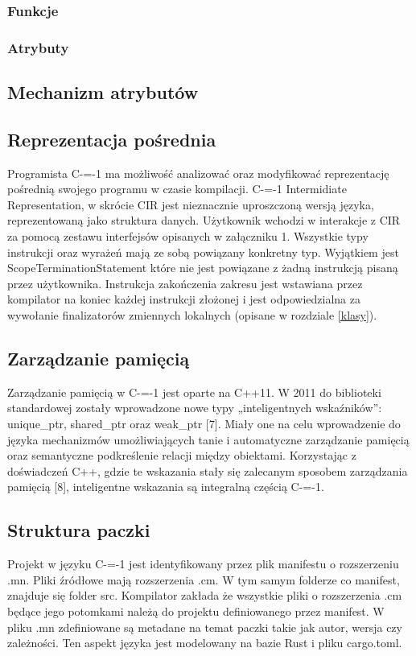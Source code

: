 \subsubsection{Funkcje}
\subsubsection{Atrybuty}
\subsection{Mechanizm atrybutów}
\subsection{Reprezentacja pośrednia}\label{reprezentacja_posrednia}
Programista C-=-1 ma możliwość analizować oraz modyfikować reprezentację pośrednią swojego programu w czasie kompilacji. C-=-1 Intermidiate Representation, w skrócie CIR jest nieznacznie uproszczoną wersją języka, reprezentowaną jako struktura danych.
Użytkownik wchodzi w interakcje z CIR za pomocą zestawu interfejsów opisanych w załączniku 1. Wszystkie typy instrukcji oraz wyrażeń mają ze sobą powiązany konkretny typ. Wyjątkiem jest ScopeTerminationStatement które nie jest powiązane z żadną instrukcją pisaną przez użytkownika. Instrukcja zakończenia zakresu jest wstawiana przez kompilator na koniec każdej instrukcji złożonej i jest odpowiedzialna za wywołanie finalizatorów zmiennych lokalnych (opisane w rozdziale \ref{klasy}).
\subsection{Zarządzanie pamięcią}
Zarządzanie pamięcią w C-=-1 jest oparte na C++11. W 2011 do biblioteki standardowej zostały wprowadzone nowe typy „inteligentnych wskaźników”: unique\_ptr, shared\_ptr oraz weak\_ptr [7]. Miały one na celu wprowadzenie do języka mechanizmów umożliwiających tanie i automatyczne zarządzanie pamięcią oraz semantyczne podkreślenie relacji między obiektami.
Korzystając z doświadczeń C++, gdzie te wskazania stały się zalecanym sposobem zarządzania pamięcią [8], inteligentne wskazania są integralną częścią C-=-1.
\subsection{Struktura paczki}\label{struktura_paczki}
Projekt w języku C-=-1 jest identyfikowany przez plik manifestu o rozszerzeniu .mn. Pliki źródłowe mają rozszerzenia .cm. W tym samym folderze co manifest, znajduje się folder src. Kompilator zakłada że wszystkie pliki o rozszerzenia .cm będące jego potomkami należą do projektu definiowanego przez manifest.
W pliku .mn zdefiniowane są metadane na temat paczki takie jak autor, wersja czy zależności. Ten aspekt języka jest modelowany na bazie Rust i pliku cargo.toml.
